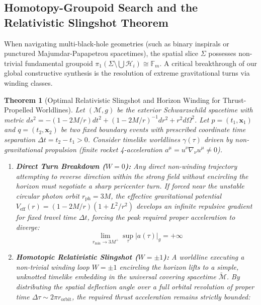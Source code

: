 \documentclass[11pt,reqno]{amsart}
\newtheorem{theorem}{Theorem}[section]
\theoremstyle{definition}
\numberwithin{equation}{section}
\begin{document}
\subsection{Homotopy-Groupoid Search and the Relativistic Slingshot Theorem}
\label{subsec:relativistic_slingshot}
When navigating multi-black-hole geometries (such as binary inspirals or punctured Majumdar-Papapetrou spacetimes), the spatial slice $\Sigma$ possesses non-trivial fundamental groupoid $\pi_1(\Sigma \setminus \bigcup \mathcal{H}_i) \cong \mathbb{F}_m$. A critical breakthrough of our global constructive synthesis is the resolution of extreme gravitational turns via winding classes.

\begin{theorem}[Optimal Relativistic Slingshot and Horizon Winding for Thrust-Propelled Worldlines]
\label{thm:relativistic_slingshot}
Let $(\mathcal{M}, g)$ be the exterior Schwarzschild spacetime with metric $ds^2 = -(1-2M/r)dt^2 + (1-2M/r)^{-1}dr^2 + r^2 d\Omega^2$. Let $p = (t_1, \mathbf{x}_1)$ and $q = (t_2, \mathbf{x}_2)$ be two fixed boundary events with prescribed coordinate time separation $\Delta t = t_2 - t_1 > 0$. Consider timelike worldlines $\gamma(\tau)$ driven by non-gravitational propulsion (finite rocket 4-acceleration $a^\mu = u^\nu \nabla_\nu u^\mu \ne 0$).
\begin{enumerate}
    \item \textbf{Direct Turn Breakdown ($W = 0$):} Any direct non-winding trajectory attempting to reverse direction within the strong field without encircling the horizon must negotiate a sharp pericenter turn. If forced near the unstable circular photon orbit $r_{\mathrm{ph}} = 3M$, the effective gravitational potential $V_{\mathrm{eff}}(r) = (1-2M/r)(1 + L^2/r^2)$ develops an infinite repulsive gradient for fixed travel time $\Delta t$, forcing the peak required proper acceleration to diverge:
    \begin{equation}
    \lim_{r_{\min} \to 3M^+} \sup_\tau |a(\tau)|_g = +\infty
    \end{equation}
    \item \textbf{Homotopic Relativistic Slingshot ($W = \pm 1$):} A worldline executing a non-trivial winding loop $W = \pm 1$ encircling the horizon lifts to a simple, unknotted timelike embedding in the universal covering spacetime $\widetilde{\mathcal{M}}$. By distributing the spatial deflection angle over a full orbital revolution of proper time $\Delta \tau \sim 2\pi r_{\mathrm{orbit}}$, the required thrust acceleration remains strictly bounded:

\end{enumerate}
\end{theorem}
\end{document}
